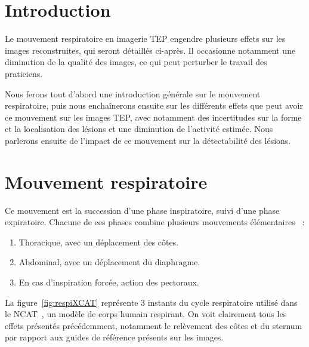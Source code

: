 \section{Introduction}

Le mouvement respiratoire en imagerie TEP engendre plusieurs effets sur les images reconstruites, qui seront détaillés ci-après. Il occasionne notamment une diminution de la qualité des images, ce qui peut perturber le travail des praticiens. 

Nous ferons tout d'abord une introduction générale sur le mouvement respiratoire, puis nous enchaînerons ensuite sur les différents effets que peut avoir ce mouvement sur les images TEP, avec notamment des incertitudes sur la forme et la localisation des lésions et une diminution de l'activité estimée. Nous parlerons ensuite de l'impact de ce mouvement sur la détectabilité des lésions.

\section{Mouvement respiratoire}

Ce mouvement est la succession d'une phase inspiratoire, suivi d'une phase expiratoire. Chacune de ces phases combine plusieurs mouvements élémentaires~\cite{servant2007cours} :
 
\begin{enumerate}
 \item Thoracique, avec un déplacement des côtes.
 \item Abdominal, avec un déplacement du diaphragme.
 \item En cas d'inspiration forcée, action des pectoraux.
\end{enumerate}

La figure~\ref{fig:respiXCAT} représente 3 instants du cycle respiratoire utilisé dans le NCAT~\cite{segars2001These}, un modèle de corps humain respirant. On voit clairement tous les effets présentés précédemment, notamment le relèvement des côtes et du sternum par rapport aux guides de référence  présents sur les images.


